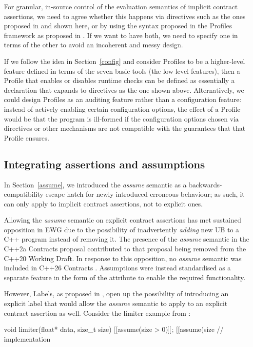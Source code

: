 {For granular, in-source control of the evaluation semantics of implicit contract assertions, we need to agree whether this happens via directives such as the ones proposed in  \cite{P3400R1} and shown here, or by using the syntax proposed in the Profiles framework as proposed in \cite{P3589R2}. If we want to have both, we need to specify one in terms of the other to avoid an incoherent and messy design. 

If we follow the idea in Section~\ref{config} and consider Profiles to be a higher-level feature defined in terms of the seven basic tools (the low-level features), then a Profile that enables or disables runtime checks can be defined as essentially a declaration that expands to \cite{P3400R1} directives as the one shown above. Alternatively, we could design Profiles as an auditing feature rather than a configuration feature: instead of actively enabling certain configuration options, the effect of a Profile would be that the  program is ill-formed if the configuration options chosen via  \cite{P3400R1} directives or other mechanisms are not compatible with the guarantees that that Profile ensures.

\subsection{Integrating assertions and assumptions}
\label{labels_assume}

In Section~\ref{assume}, we introduced the \emph{assume} semantic as a backwards-compatibility escape hatch for newly introduced erroneous behaviour; as such, it can only apply to implicit contract assertions, not to explicit ones.

Allowing the \emph{assume} semantic on explicit contract assertions has met sustained opposition in EWG due to the possibility of inadvertently \emph{adding} new UB to a C++ program instead of removing it. The presence of the \emph{assume} semantic in the C++2a Contracts proposal \cite{P0542R5} contributed to that proposal being removed from the C++20 Working Draft. In response to this opposition, no \emph{assume} semantic was included in C++26 Contracts \cite{P2900R14}. Assumptions were instead standardised as a separate feature in the form of the \tcode{[[assume]]} attribute \cite{P1774R8} to enable the required functionality.

However, Labels, as proposed in \cite{P3400R1}, open up the possibility of introducing an explicit label that would allow the \emph{assume} semantic to apply to an explicit contract assertion as well. Consider the limiter example from \cite{P1774R8}:
\begin{codeblock}
void limiter(float* data, size_t size) {
  [[assume(size > 0)]];
  [[assume(size %
  // implementation
}
\end{codeblock}

}

